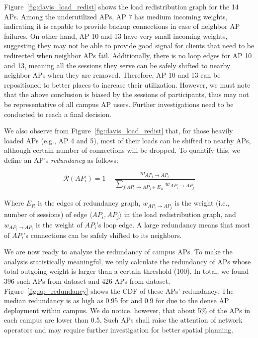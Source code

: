 Figure~\ref{fig:davis_load_redist} shows the load redistribution graph for the
14 APs. Among the underutilized APs, AP 7 has medium 
incoming weights, indicating it is capable to provide backup connections
in case of neighbor AP failures. On other hand, AP 10 and 13 have very small incoming
weights, suggesting they may not be able to provide good signal for clients
that need to be redirected when neighbor APs fail. Additionally, there is no loop edges for
AP 10 and 13, meaning all the \wifi{} sessions they serve can be safely shifted to
nearby neighbor APs when they are removed. Therefore, AP 10 and 13 can be
repositioned to better places to increase their utilization. However, we must
note that the above conclusion is biased by the \wifi{} sessions of \PhoneLab{}
participants, thus may not be representative of all campus AP users. Further
investigations need to be conducted to reach a final decision.

We also observe from Figure~\ref{fig:davis_load_redist} that, for those heavily
loaded APs (e.g., AP 4 and 5), most of their loads can be shifted to nearby APs,
although certain number of connections will be dropped. To quantify this, we define an
AP's \textit{redundancy} as follows:

\begin{equation}
  \mathcal{R}(AP_i) = 1 - \frac{w_{AP_i \rightarrow AP_i}}{\sum_{j|AP_i \rightarrow
    AP_j \in E_R} w_{AP_i \rightarrow AP_j}}
\end{equation}

Where $E_R$ is the edges of redundancy graph, $w_{AP_i \rightarrow AP_j}$ is the weight (i.e., number of sessions)
of edge $\langle AP_i, AP_j\rangle$ in the load redistribution graph, and
$w_{AP_i \rightarrow AP_i}$ is the weight of $AP_i$'s loop edge. A large
redundancy means that most of $AP_i$'s connections can be safely shifted to its
neighbors.

We are now ready to analyze the redundancy of campus APs. To make the analysis
statistically meaningful, we only calculate the redundancy of APs whose total
outgoing weight is larger than a certain threshold (100). In total, we found
396 such APs from \ubscan{} dataset and 426 APs from \ndscan{} dataset.
Figure~\ref{fig:ap_redundancy} shows the CDF of these APs' redundancy. The
median redundancy is as high as 0.95 for \ub{} and 0.9 for \nd{} due to the dense AP
deployment within campus. We do notice, however, that about 5\% of the APs in
each campus are lower than 0.5. Such APs shall raise the attention of network
operators and may require further investigation for better spatial planning.


